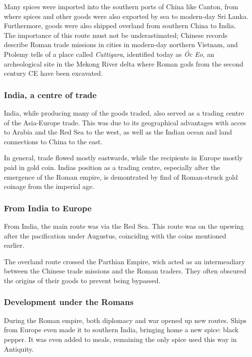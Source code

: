 \documentclass[11pt, a4paper, headings=standardclasses]{scrartcl}
\begin{document}
Many spices were imported into the southern ports of China like Canton, from where spices and other goods were also exported by sea to modern-day Sri Lanka. Furthermore, goods were also shipped overland from southern China to India.\autocite[Maps 4 and 5]{Rome} The importance of this route must not be underastimated; Chinese records describe Roman trade missions in cities in modern-day northern Vietnam\autocite{curtin_1984}, and Ptolemy tells of a place called \emph{Cattigara}, identified today as \emph{\'{O}c Eo}, an archeological site in the Mekong River delta where Roman gods from the second century CE have been excavated.\autocite{OcEo}

\subsubsection{India, a centre of trade}
India, while producing many of the goods traded, also served as a trading centre of the Asia-Europe trade. This was due to its geographical advantages with acces to Arabia and the Red Sea to the west, as well as the Indian ocean and land connections to China to the east.

In general, trade flowed mostly eastwards, while the recipients in Europe mostly paid in gold coin. Indias position as a trading centre, especially after the emergence of the Roman empire, is demontrated by find of Roman-struck gold coinage from the imperial age.\autocite[100]{curtin_1984}

\subsubsection{From India to Europe}

From India, the main route was via the Red Sea. This route was on the upswing after the pacification under Augustus, coinciding with the coins mentioned earlier.\autocite[Chapter 7]{Rome}

The overland route crossed the Parthian Empire, wich acted as an intermeadiary between the Chinese trade missions and the Roman traders. They often obscured the origins of their goods to prevent being bypassed.\autocite{SilkRome}

\subsubsection{Development under the Romans}

During the Roman empire, both diplomacy and war opened up new routes. Ships from Europe even made it to southern India, bringing home a new spice: black pepper. It was even added to meals, remaining the only spice used this way in Antiquity.\autocite{RIS}
\end{document}
